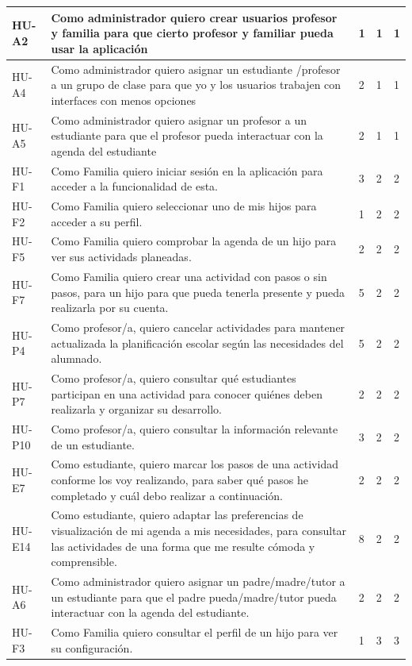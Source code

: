 \begin{xltabular}{\textwidth}{|p{2.2cm}|X|p{1.4cm}|p{1.7cm}|p{1.5cm}|}
HU-A2 & Como administrador quiero crear usuarios profesor y familia para que cierto profesor y familiar pueda usar la aplicación & 1 & 1 & 1 \\ \hline
HU-A4 & Como administrador quiero asignar un estudiante /profesor a un grupo de clase para que yo y los usuarios trabajen con interfaces con menos opciones & 2 & 1 & 1 \\ \hline
HU-A5 & Como administrador quiero asignar un profesor a un estudiante para que el profesor pueda interactuar con la agenda del estudiante & 2 & 1 & 1 \\ \hline
HU-F1 & Como Familia quiero iniciar sesión en la aplicación para acceder a la funcionalidad de esta. & 3 & 2 & 2 \\ \hline
HU-F2 & Como Familia quiero seleccionar uno de mis hijos para acceder a su perfil. & 1 & 2 & 2 \\ \hline
HU-F5 & Como Familia quiero comprobar la agenda de un hijo para ver sus actividads planeadas. & 2 & 2 & 2 \\ \hline
HU-F7 & Como Familia quiero crear una actividad con pasos o sin pasos, para un hijo para que pueda tenerla presente y pueda realizarla por su cuenta. & 5 & 2 & 2 \\ \hline
HU-P4 & Como profesor/a, quiero cancelar actividades para mantener actualizada la planificación escolar según las necesidades del alumnado. & 5 & 2 & 2\\ \hline
HU-P7 & Como profesor/a, quiero consultar qué estudiantes participan en una actividad para conocer quiénes deben realizarla y organizar su desarrollo. & 2 & 2 & 2 \\ \hline
HU-P10 & Como profesor/a, quiero consultar la información relevante de un estudiante. & 3 & 2 & 2 \\ \hline
HU-E7 & Como estudiante, quiero marcar los pasos de una actividad conforme los voy realizando, para saber qué pasos he completado y cuál debo realizar a continuación. & 2 & 2 & 2 \\ \hline
HU-E14 & Como estudiante, quiero adaptar las preferencias de visualización de mi agenda a mis necesidades, para consultar las actividades de una forma que me resulte cómoda y comprensible. & 8 & 2 & 2 \\ \hline
HU-A6 & Como administrador quiero asignar un padre/madre/tutor a un estudiante para que el padre pueda/madre/tutor pueda interactuar con la agenda del estudiante. & 2 & 2 & 2 \\ \hline
HU-F3 & Como Familia quiero consultar el perfil de un hijo para ver su configuración. & 1 & 3 & 3 \\ \hline

\end{xltabular}
